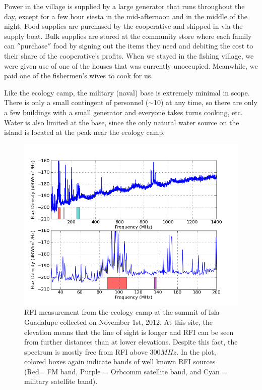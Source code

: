 Power in the village is supplied by a large generator that runs throughout the day, except for a few hour siesta in the mid-afternoon and in the middle of the night. Food supplies are purchased by the cooperative and shipped in via the supply boat. Bulk supplies are stored at the community store where each family can $''$purchase$''$ food by signing out the items they need and debiting the cost to their share of the cooperative's profits. When we stayed in the fishing village, we were given use of one of the houses that was currently unoccupied. Meanwhile, we paid one of the fishermen's wives to cook for us.  

Like the ecology camp, the military (naval) base is extremely minimal in scope. There is only a small contingent of personnel ($\sim$10) at any time, so there are only a few buildings with a small generator and everyone takes turns cooking, etc. Water is also limited at the base, since the only natural water source on the island is located at the peak near the ecology camp. 

\begin{figure}[tb]
\begin{center}
\includegraphics[width=0.9\linewidth]{RFI_testing/figures/GI_3__bands.png}
\caption{RFI measurement from the ecology camp at the summit of Isla Guadalupe collected on November 1st, 2012. At this site, the elevation means that the line of sight is longer and RFI can be seen from further distances than at lower elevations. Despite this fact, the spectrum is mostly free from RFI above $300 MHz$. In the plot, colored boxes again indicate bands of well known RFI sources (Red= FM band, Purple = Orbcomm satellite band, and Cyan = military satellite band).}
\label{Fig:guadsummit}
\end{center}
\end{figure}

